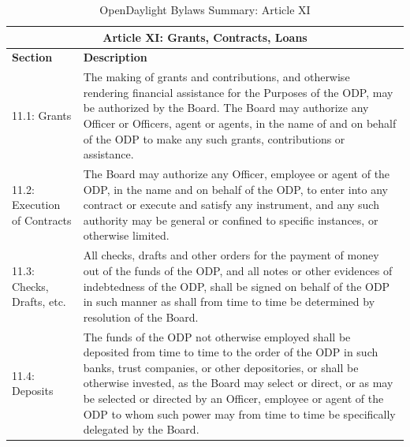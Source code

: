 \documentclass[a4paper, 12pt]{book}
\begin{document}
\begin{table}[H]
  \begin{center}
    \begin{tabular}{ | p{4cm} | p{11cm} | }
    \toprule
    \multicolumn {2}{|c|}{\textbf{Article XI: Grants, Contracts, Loans}} \\
    \hline
    \textbf{Section} & \textbf{Description} \\
    \hline
    11.1: Grants & The making of grants and contributions, and otherwise rendering financial assistance for the Purposes of the ODP, may be authorized by the Board. The Board may authorize any Officer or Officers, agent or agents, in the name of and on behalf of the ODP to make any such grants, contributions or assistance.\\
    \hline
    11.2: Execution of Contracts & The Board may authorize any Officer, employee or agent of the ODP, in the name and on behalf of the ODP, to enter into any contract or execute and satisfy any instrument, and any such authority may be general or confined to specific instances, or otherwise limited.\\
    \hline
    11.3: Checks, Drafts, etc. & All checks, drafts and other orders for the payment of money out of the funds of the ODP, and all notes or other evidences of indebtedness of the ODP, shall be signed on behalf of the ODP in such manner as shall from time to time be determined by resolution of the Board.\\
    \hline
    11.4: Deposits & The funds of the ODP not otherwise employed shall be deposited from time to time to the order of the ODP in such banks, trust companies, or other depositories, or shall be otherwise invested, as the Board may select or direct, or as may be selected or directed by an Officer, employee or agent of the ODP to whom such power may from time to time be specifically delegated by the Board.\\
    \bottomrule
    \end{tabular}
    \caption{OpenDaylight Bylaws Summary: Article XI}
    \label{tab:odlbylaws-art11}
  \end{center}
\end{table}
\end{document}
